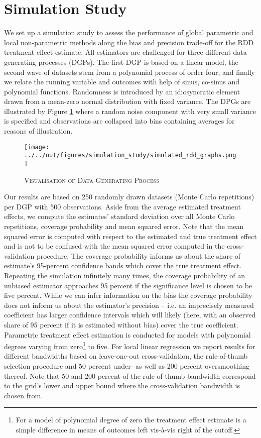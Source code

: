 


\section{Simulation Study} %
\label{sec:sim_study}

We set up a simulation study to assess the performance of global parametric and local non-parametric methods along the bias and precision trade-off for the RDD treatment effect estimate. All estimators are challenged for three different data-generating processes (DGPs). The first DGP is based on a linear model, the second wave of datasets stem from a polynomial process of order four, and finally we relate the running variable and outcomes with help of sinus, co-sinus and polynomial functions. Randomness is introduced by an idiosyncratic element drawn from a mean-zero normal distribution with fixed variance. The DPGs are illustrated by Figure \ref{fig: dgp} where a random noise component with very small variance is specified and observations are collapsed into bins containing averages for reasons of illustration.

\begin{figure}[H]
	\centering
	\texttt{[image: ../../out/figures/simulation\_study/simulated\_rdd\_graphs.png]}
	\caption{\textsc{Visualisation of Data-Generating Process}}
	\label{fig: dgp}
\end{figure}

Our results are based on 250 randomly drawn datasets (Monte Carlo repetitions) per DGP with 500 observations. Aside from the average estimated treatment effects, we compute the estimates' standard deviation over all Monte Carlo repetitions, coverage probability and mean squared error. Note that the mean squared error is computed with respect to the estimated and true treatment effect and is not to be confused with the mean squared error computed in the cross-validation procedure. The coverage probability informs us about the share of estimate's 95-percent confidence bands which cover the true treatment effect. Repeating the simulation infinitely many times, the coverage probability of an unbiased estimator approaches 95 percent if the significance level is chosen to be five percent. While we can infer information on the bias the coverage probability does not inform us about the estimator's precision -- i.e. an imprecisely measured coefficient has larger confidence intervals which will likely (here, with an observed share of 95 percent if it is estimated without bias) cover the true coefficient. Parametric treatment effect estimation is conducted for models with polynomial degrees varying from zero\footnote{For a model of polynomial degree of zero the treatment effect estimate is a simple difference in means of outcomes left vis-à-vis right of the cutoff.} to five. For local linear regression we report results for different bandwidths based on leave-one-out cross-validation, the rule-of-thumb selection procedure and 50 percent under- as well as 200 percent oversmoothing thereof. Note that 50 and 200 percent of the rule-of-thumb bandwidth correspond to the grid's lower and upper bound where the cross-validation bandwidth is chosen from.


